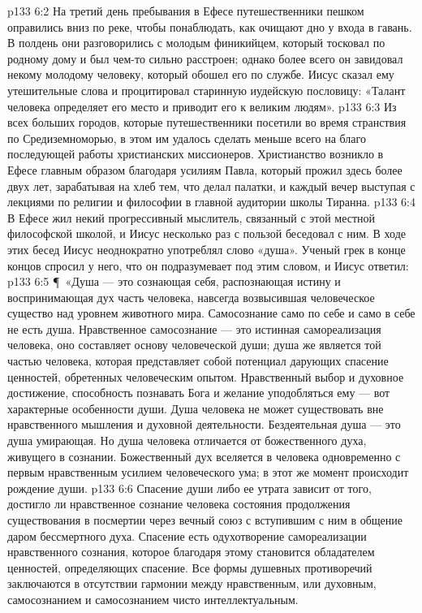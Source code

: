 \vs p133 6:2 На третий день пребывания в Ефесе путешественники пешком оправились вниз по реке, чтобы понаблюдать, как очищают дно у входа в гавань. В полдень они разговорились с молодым финикийцем, который тосковал по родному дому и был чем\hyp{}то сильно расстроен; однако более всего он завидовал некому молодому человеку, который обошел его по службе. Иисус сказал ему утешительные слова и процитировал старинную иудейскую пословицу: «Талант человека определяет его место и приводит его к великим людям».
\vs p133 6:3 Из всех больших городов, которые путешественники посетили во время странствия по Средиземноморью, в этом им удалось сделать меньше всего на благо последующей работы христианских миссионеров. Христианство возникло в Ефесе главным образом благодаря усилиям Павла, который прожил здесь более двух лет, зарабатывая на хлеб тем, что делал палатки, и каждый вечер выступая с лекциями по религии и философии в главной аудитории школы Тиранна.
\vs p133 6:4 В Ефесе жил некий прогрессивный мыслитель, связанный с этой местной философской школой, и Иисус несколько раз с пользой беседовал с ним. В ходе этих бесед Иисус неоднократно употреблял слово «душа». Ученый грек в конце концов спросил у него, что он подразумевает под этим словом, и Иисус ответил:
\vs p133 6:5 \P\ «Душа --- это сознающая себя, распознающая истину и воспринимающая дух часть человека, навсегда возвысившая человеческое существо над уровнем животного мира. Самосознание само по себе и само в себе не есть душа. Нравственное самосознание --- это истинная самореализация человека, оно составляет основу человеческой души; душа же является той частью человека, которая представляет собой потенциал дарующих спасение ценностей, обретенных человеческим опытом. Нравственный выбор и духовное достижение, способность познавать Бога и желание уподобляться ему --- вот характерные особенности души. Душа человека не может существовать вне нравственного мышления и духовной деятельности. Бездеятельная душа --- это душа умирающая. Но душа человека отличается от божественного духа, живущего в сознании. Божественный дух вселяется в человека одновременно с первым нравственным усилием человеческого ума; в этот же момент происходит рождение души.
\vs p133 6:6 Спасение души либо ее утрата зависит от того, достигло ли нравственное сознание человека состояния продолжения существования в посмертии через вечный союз с вступившим с ним в общение даром бессмертного духа. Спасение есть одухотворение самореализации нравственного сознания, которое благодаря этому становится обладателем ценностей, определяющих спасение. Все формы душевных противоречий заключаются в отсутствии гармонии между нравственным, или духовным, самосознанием и самосознанием чисто интеллектуальным.
